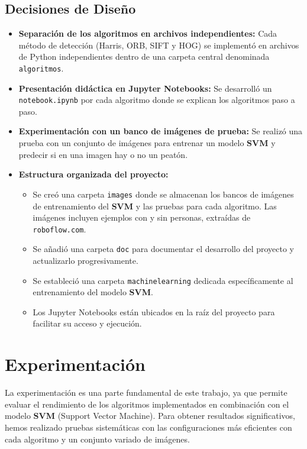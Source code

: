 \documentclass[a4paper]{article}
\begin{document}
\subsection{Decisiones de Diseño}

\begin{itemize}
\item \textbf{Separación de los algoritmos en archivos independientes:} Cada método de detección (Harris, ORB, SIFT y HOG) se implementó en archivos de Python independientes dentro de una carpeta central denominada \texttt{algoritmos}.
\item \textbf{Presentación didáctica en Jupyter Notebooks:} Se desarrolló un \texttt{notebook.ipynb} por cada algoritmo donde se explican los algoritmos paso a paso.
\item \textbf{Experimentación con un banco de imágenes de prueba:} Se realizó una prueba con un conjunto de imágenes para entrenar un modelo \textbf{SVM} y predecir si en una imagen hay o no un peatón.
\item \textbf{Estructura organizada del proyecto:}  
    \begin{itemize}
        \item Se creó una carpeta \texttt{images} donde se almacenan los bancos de imágenes de entrenamiento del \textbf{SVM} y las pruebas para cada algoritmo. Las imágenes incluyen ejemplos con y sin personas, extraídas de \texttt{roboflow.com}.
        \item Se añadió una carpeta \texttt{doc} para documentar el desarrollo del proyecto y actualizarlo progresivamente.
        \item Se estableció una carpeta \texttt{machinelearning} dedicada específicamente al entrenamiento del modelo \textbf{SVM}.
        \item Los Jupyter Notebooks están ubicados en la raíz del proyecto para facilitar su acceso y ejecución.
    \end{itemize}
\end{itemize}

\newpage

\section{Experimentación}

La experimentación es una parte fundamental de este trabajo, ya que permite evaluar el rendimiento de los algoritmos implementados en combinación con el modelo \textbf{SVM} (Support Vector Machine). 
Para obtener resultados significativos, hemos realizado pruebas sistemáticas con las configuraciones más eficientes con cada algoritmo y un conjunto variado de imágenes.
\par \hspace{1cm}
\end{document}
